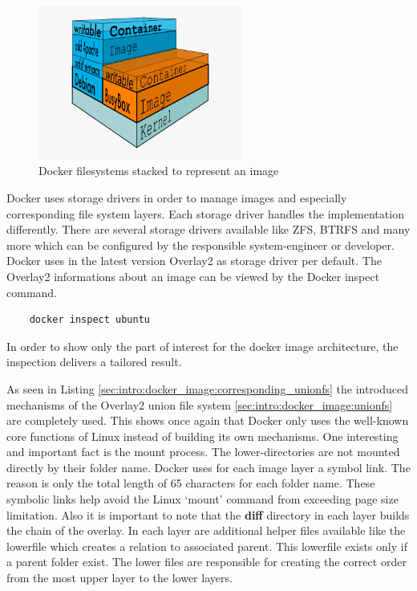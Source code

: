 \begin{figure}[htbp]
 \centering
 \includegraphics[width=0.6\textwidth]{gfx/examples/docker-filesystems-busyboxrw}
 \caption{Docker filesystems stacked to represent an image}
\label{sec:intro:docker_image:docker_image_stack}
\end{figure}
Docker uses storage drivers in order to manage images and especially corresponding file system layers. Each storage driver handles the implementation differently.
There are several storage drivers available like ZFS, BTRFS and many more which can be configured by the responsible system-engineer or developer. Docker uses in the latest version Overlay2 as storage driver per default. The Overlay2 informations about an image can be viewed by the Docker inspect command.
\begin{lstlisting}
	docker inspect ubuntu
\end{lstlisting}
In order to show only the part of interest for the docker image architecture, the inspection delivers a tailored result.


As seen in Listing \ref{sec:intro:docker_image:corresponding_unionfs} the introduced mechanisms of the Overlay2 union file system \ref{sec:intro:docker_image:unionfs} are completely used.
This shows once again that Docker only uses the well-known core functions of Linux instead of building its own mechanisms.
One interesting and important fact is the mount process. The lower-directories are not mounted directly by their folder name. Docker uses for each image layer a symbol link. The reason is only the total length of 65 characters for each folder name. These symbolic links help avoid the Linux ‘mount’ command from exceeding page size limitation.
Also it is important to note that the \textbf{diff} directory in each layer builds the chain of the overlay. In each layer are additional helper files available like the lowerfile which creates a relation to associated parent. This lowerfile exists only if a parent folder exist.
The lower files are responsible for creating the correct order from the most upper layer to the lower layers.

